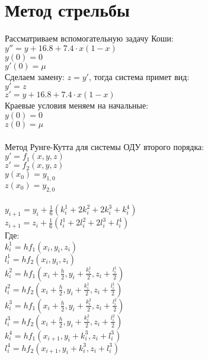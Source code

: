 \documentclass[12pt,a4paper]{article}
\begin{document}
    \section*{Метод стрельбы}
        Рассматриваем вспомогательную задачу Коши:\\
        $y'' = y + 16.8 + 7.4 \cdot x(1 - x)$\\
        $y(0) = 0$\\
        $y'(0) = \mu$\\
        Сделаем замену: $z = y'$, тогда система примет вид:\\
        $y' = z$\\
        $z' = y + 16.8 + 7.4 \cdot x(1 - x)$\\
        Краевые условия меняем на начальные:\\
        $y(0) = 0$\\
        $z(0) = \mu$\\\\
        
        \noindent
        Метод Рунге-Кутта для системы ОДУ второго порядка:\\
        $y' = f_{1}(x, y, z)$\\
        $z' = f_{2}(x, y, z)$\\
        $y(x_{0}) = y_{1,0}$\\
        $z(x_{0}) = y_{2,0}$\\\\
        
        \newpage
        \noindent
        $y_{i+1} = y_{i} + \frac{1}{6}(k_{i}^{1} +2k_{i}^{2} + 2k_{i}^3 + k_{i}^4)$\\
        $z_{i+1} = z_{i} + \frac{1}{6}(l_{i}^{1} +2l_{i}^{2} + 2l_{i}^3 + l_{i}^4)$\\
        Где:\\
        $k_{i}^{1} = hf_{1}(x_{i}, y_{i}, z_{i})$\\
        $l_{i}^{1} = hf_{2}(x_{i}, y_{i}, z_{i})$\\
        $k_{i}^{2} = hf_{1}(x_{i} + \frac{h}{2}, y_{i} + \frac{k_{i}^{1}}{2},
            z_{i} + \frac{l_{i}^{1}}{2})$\\
        $l_{i}^{2} = hf_{2}(x_{i} + \frac{h}{2}, y_{i} + \frac{k_{i}^{1}}{2},
            z_{i} + \frac{l_{i}^{1}}{2})$\\
        $k_{i}^{3} = hf_{1}(x_{i} + \frac{h}{2}, y_{i} + \frac{k_{i}^{2}}{2},
            z_{i} + \frac{l_{i}^{2}}{2})$\\
        $l_{i}^{3} = hf_{2}(x_{i} + \frac{h}{2}, y_{i} + \frac{k_{i}^{2}}{2},
            z_{i} + \frac{l_{i}^{2}}{2})$\\
        $k_{i}^{4} = hf_{1}(x_{i+1}, y_{i} + k_{i}^{3}, z_{i} + l_{i}^{3})$\\
        $l_{i}^{4} = hf_{2}(x_{i+1}, y_{i} + k_{i}^{3}, z_{i} + l_{i}^{3})$\\\\
        
\end{document}
